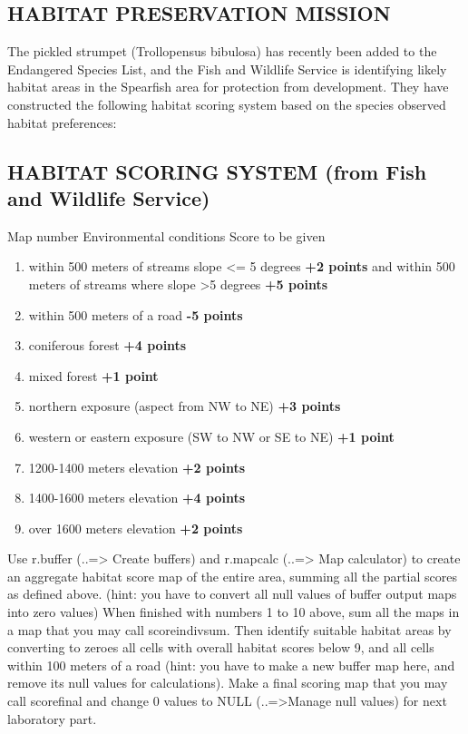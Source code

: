 \subsection{HABITAT PRESERVATION MISSION}
The pickled strumpet (Trollopensus bibulosa) has recently been added to the Endangered Species List, and the Fish and Wildlife Service is identifying likely habitat areas in the Spearfish area for protection from development. They have constructed the following habitat scoring system based on the species observed habitat preferences:

\subsection{HABITAT SCORING SYSTEM (from Fish and Wildlife Service) }

Map number Environmental conditions Score to be given
\begin{enumerate}
 \item within 500 meters of streams slope <= 5 degrees \textbf{+2 points} and within 500 meters of streams where slope >5 degrees \textbf{+5 points}
 \item within 500 meters of a road \textbf{-5 points}
 \item coniferous forest \textbf{+4 points}
 \item mixed forest \textbf{+1 point}
 \item northern exposure (aspect from NW to NE) \textbf{+3 points}
 \item western or eastern exposure (SW to NW or SE to NE) \textbf{+1 point}
 \item 1200-1400 meters elevation \textbf{+2 points}
 \item 1400-1600 meters elevation \textbf{+4 points}
 \item over 1600 meters elevation \textbf{+2 points}
\end{enumerate}

Use r.buffer (..=> Create buffers) and r.mapcalc (..=> Map calculator) to create an aggregate habitat score map of the entire area, summing all the partial scores as defined above. (hint: you have to convert all null values of buffer output maps into zero values)
When finished with numbers 1 to 10 above, sum all the maps in a map that you may call scoreindivsum. Then identify suitable habitat areas by converting to zeroes all cells with overall habitat scores below 9, and all cells within 100 meters of a road (hint: you have to make a new buffer map here, and remove its null values for calculations). Make a final scoring map that you may call scorefinal and change 0 values to NULL (..=>Manage null values) for next laboratory part.

